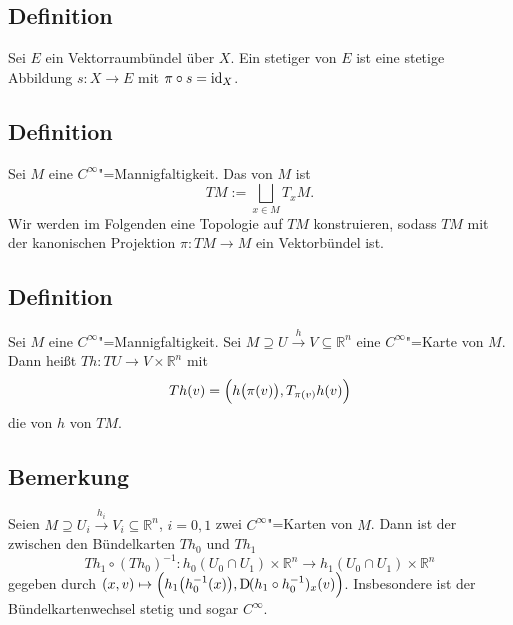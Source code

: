 \subsection[Definition: Schnitt eines Vektorbündels]{Definition} %
\label{sub:194}
Sei $E$ ein Vektorraumbündel über $X$. Ein stetiger  von $E$ ist eine stetige Abbildung $s : X \to E$ mit $\pi \circ s = \id_X$.

\subsection[Definition: Tangentialbündel]{Definition} %
\label{sub:195}
Sei $M$ eine $C^\infty$"=Mannigfaltigkeit. Das  von $M$ ist 
\[
	T M := \bigsqcup_{x \in M} T_x M.
\]
Wir werden im Folgenden eine Topologie auf $T M$ konstruieren, sodass $T M$ mit der kanonischen Projektion $\pi : T M \to M$ ein Vektorbündel ist.

\subsection[Definition: Induzierte Bündelkarte]{Definition} %
\label{sub:196}
Sei $M$ eine $C^\infty$"=Mannigfaltigkeit. Sei $M \supseteq U \xrightarrow{\, h \,} V \subseteq \mathds{R}^n$ eine $C^\infty$"=Karte von $M$. Dann heißt 
$T h : T U \to V \times \mathds{R}^n$ mit 
\[
	T h (v) = \enbrace[\Big]{h \enbrace[\big]{\pi(v)}, T_{\pi(v)} h (v)}  
\]
die von $h$  von $T M$. 

\subsection[Bemerkung: Bündelkartenwechsel]{Bemerkung} %
\label{sub:197}
Seien $M \supseteq U_i \xrightarrow{\, h_i \,} V_i \subseteq \mathds{R}^n $, $i=0,1$ zwei $C^\infty$"=Karten von $M$. Dann ist der  zwischen den 
Bündelkarten $T h_0$ und $T h_1$
\[
	T h_1 \circ (T h_0) ^{-1} : h_0(U_0 \cap U_1) \times \mathds{R}^n \longrightarrow h_1(U_0 \cap U_1) \times \mathds{R}^n
\]
gegeben durch $(x,v) \mapsto \enbrace[\Big]{h_1 \enbrace*{h_0^{-1}(x)}, \D ( h_1 \circ h_0 ^{-1})_x (v)}$. Insbesondere ist der Bündelkartenwechsel stetig und sogar 
$C^\infty$.

